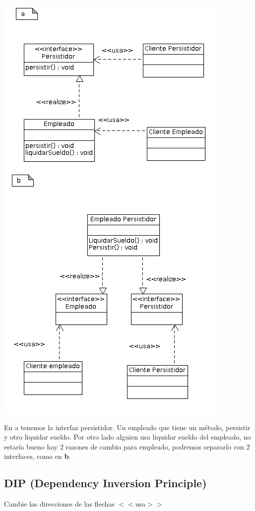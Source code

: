 \documentclass[10pt,a4paper]{article}
\begin{document}
\includegraphics[scale=0.6]{./img/empleado-persistidor.png} 

En a tenemos la interfaz persistidor. Un empleado que tiene  un método, persistir y otro liquidar sueldo. Por otro lado alguien usa liquidar sueldo del empleado, 
no estaría bueno hay 2 razones de cambio para empleado, podremos separarlo con 2 interfaces, como en \textbf{b}.


\subsection{DIP (Dependency Inversion Principle)}
Cambie las direcciones de las flechas $<<$usa$>>$
\end{document}
